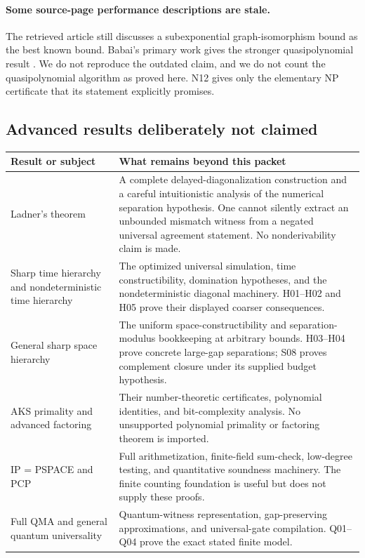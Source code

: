 \paragraph{Some source-page performance descriptions are stale.}
The retrieved article still discusses a subexponential graph-isomorphism bound as the best known bound. Babai's primary work gives the stronger quasipolynomial result \cite{Babai2016}. We do not reproduce the outdated claim, and we do not count the quasipolynomial algorithm as proved here. N12 gives only the elementary NP certificate that its statement explicitly promises.

\subsection{Advanced results deliberately not claimed}
\begin{longtable}{p{}p{}}
\toprule
Result or subject & What remains beyond this packet \\
\midrule\endhead
Ladner's theorem & A complete delayed-diagonalization construction and a careful intuitionistic analysis of the numerical separation hypothesis. One cannot silently extract an unbounded mismatch witness from a negated universal agreement statement. No nonderivability claim is made. \\
Sharp time hierarchy and nondeterministic time hierarchy & The optimized universal simulation, time constructibility, domination hypotheses, and the nondeterministic diagonal machinery. H01--H02 and H05 prove their displayed coarser consequences. \\
General sharp space hierarchy & The uniform space-constructibility and separation-modulus bookkeeping at arbitrary bounds. H03--H04 prove concrete large-gap separations; S08 proves complement closure under its supplied budget hypothesis. \\
AKS primality and advanced factoring & Their number-theoretic certificates, polynomial identities, and bit-complexity analysis. No unsupported polynomial primality or factoring theorem is imported. \\
IP = PSPACE and PCP & Full arithmetization, finite-field sum-check, low-degree testing, and quantitative soundness machinery. The finite counting foundation is useful but does not supply these proofs. \\
Full QMA and general quantum universality & Quantum-witness representation, gap-preserving approximations, and universal-gate compilation. Q01--Q04 prove the exact stated finite model. \\

\end{longtable}

